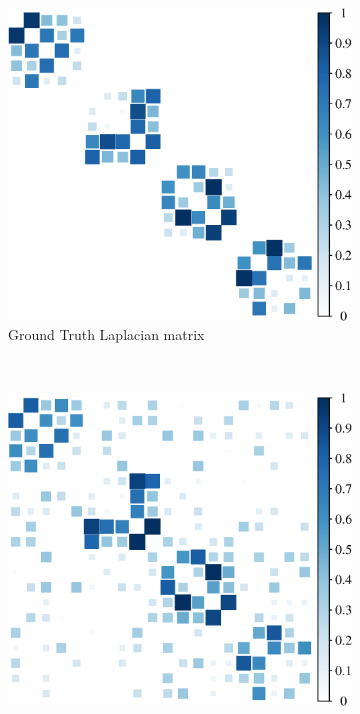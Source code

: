 \begin{figure}[!htb]
    \centering
    \begin{subfigure}[b]{0.3\textwidth}
      \includegraphics[width=\textwidth]{block-diagonal/latex/figures/true_mat.eps}
        \caption{Ground Truth Laplacian matrix}
    \end{subfigure}
    ~ %
    \begin{subfigure}[b]{0.3\textwidth}
        \includegraphics[width=\textwidth]{block-diagonal/latex/figures/noisy_mat.eps}

\end{subfigure}
\end{figure}
